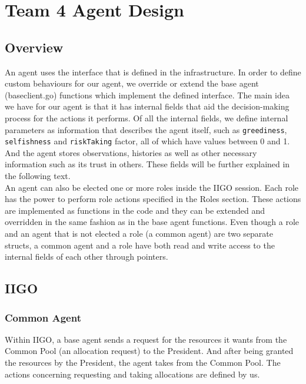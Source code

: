 \chapter{Team 4 Agent Design}

\section{Overview}
An agent uses the interface that is defined in the infrastructure. In order to define custom behaviours for our agent, we override or extend the base agent (baseclient.go) functions which implement the defined interface. The main idea we have for our agent is that it has internal fields that aid the decision-making process for the actions it performs. Of all the internal fields, we define internal parameters as information that describes the agent itself, such as \texttt{greediness}, \texttt{selfishness} and \texttt{riskTaking} factor, all of which have values between 0 and 1. And the agent stores observations, histories as well as other necessary information such as its trust in others. These fields will be further explained in the following text.\\

\noindent An agent can also be elected one or more roles inside the IIGO session. Each role has the power to perform role actions specified in the Roles section. These actions are implemented as functions in the code and they can be extended and overridden in the same fashion as in the base agent functions. Even though a role and an agent that is not elected a role (a common agent) are two separate structs, a common agent and a role have both read and write access to the internal fields of each other through pointers.


\section{IIGO}
\subsection{Common Agent}
Within IIGO, a base agent sends a request for the resources it wants from the Common Pool (an allocation request) to the President. And after being granted the resources by the President, the agent takes from the Common Pool. The actions concerning requesting and taking allocations are defined by us.\\

